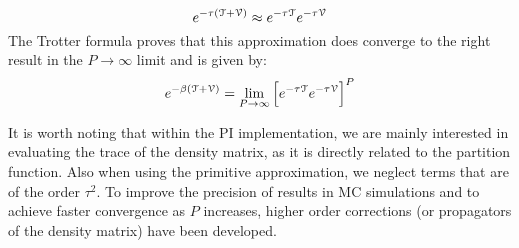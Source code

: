         \begin{equation}\label{eq:primitiveApprox}
            e^{- \tau (\text{$\mathcal{T}$} + \text{$\mathcal{V}$})} \approx e^{- \tau \text{$\mathcal{T}$}} e^{- \tau \text{$\mathcal{V}$}}
        \end{equation}
        The Trotter formula proves that this approximation does converge to the right result in the $P \to \infty$ limit and is given by:
        \begin{equation}\label{eq:trotter}
            e^{- \beta (\text{$\mathcal{T}$} + \text{$\mathcal{V}$})} = \lim_{P \to \infty} \Big[ e^{- \tau \text{$\mathcal{T}$}} e^{- \tau \text{$\mathcal{V}$}} \Big]^P
        \end{equation}

        It is worth noting that within the PI implementation, we are mainly interested in evaluating the trace of the density matrix, as it is directly related to the partition function. Also when using the primitive approximation, we neglect terms that are of the order $\tau^2$. To improve the precision of results in MC simulations and to achieve faster convergence as $P$ increases, higher order corrections (or propagators of the density matrix) have been developed.

